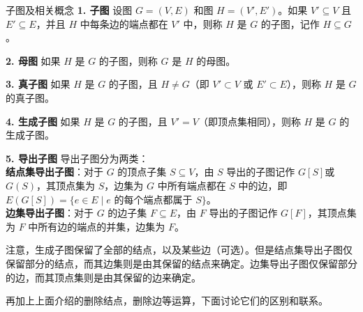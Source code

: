 \documentclass[lang=cn,11pt]{elegantbook}
\begin{document}
\begin{definition}{子图及相关概念}
\textbf{1. 子图}
设图 $G = (V, E)$ 和图 $H = (V', E')$。如果 $V' \subseteq V$ 且 $E' \subseteq E$，并且 $H$ 中每条边的端点都在 $V'$ 中，则称 $H$ 是 $G$ 的子图，记作 $H \subseteq G$。

\textbf{2. 母图}
如果 $H$ 是 $G$ 的子图，则称 $G$ 是 $H$ 的母图。

\textbf{3. 真子图}
如果 $H$ 是 $G$ 的子图，且 $H \neq G$（即 $V' \subset V$ 或 $E' \subset E$），则称 $H$ 是 $G$ 的真子图。

\textbf{4. 生成子图}
如果 $H$ 是 $G$ 的子图，且 $V' = V$（即顶点集相同），则称 $H$ 是 $G$ 的生成子图。

\textbf{5. 导出子图}
导出子图分为两类：\\
\textbf{结点集导出子图}：对于 $G$ 的顶点子集 $S \subseteq V$，由 $S$ 导出的子图记作 $G[S]$或$G(S)$，其顶点集为 $S$，边集为 $G$ 中所有端点都在 $S$ 中的边，即 $E(G[S])=\{e\in E\mid e\text{ 的每个端点都属于 }S\}$。\\
\textbf{边集导出子图}：对于 $G$ 的边子集 $F \subseteq E$，由 $F$ 导出的子图记作 $G[F]$，其顶点集为 $F$ 中所有边的端点的并集，边集为 $F$。
\end{definition}
注意，生成子图保留了全部的结点，以及某些边（可选）。但是结点集导出子图仅保留部分的结点，而其边集则是由其保留的结点来确定。边集导出子图仅保留部分的边，而其顶点集则是由其保留的边来确定。

再加上上面介绍的删除结点，删除边等运算，下面讨论它们的区别和联系。
\end{document}

